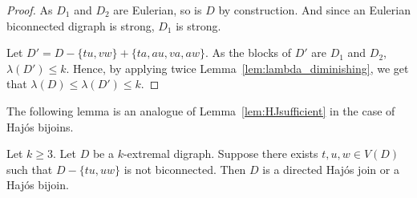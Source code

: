 \begin{proof}
    \smallskip

    As $D_1$ and $D_2$ are Eulerian,  so is $D$ by construction. And since an Eulerian biconnected digraph is strong, $D_1$ is strong. 

    \smallskip 
    
    Let $D' = D - \{tu,vw\} + \{ta,au,va,aw\}$. As the blocks of $D'$ are $D_1$ and $D_2$, $\lambda(D') \leq k$. Hence, by applying twice Lemma~\ref{lem:lambda_diminishing}, we get that $\lambda(D) \leq \lambda(D')  \leq k$.  
\end{proof}

The following lemma is an analogue of Lemma~\ref{lem:HJsufficient} in the case of Haj\'os bijoins.
\begin{lemma}\label{lem:HB_sufficient}
    Let $k \geq 3$. Let $D$ be a $k$-extremal digraph. Suppose there exists $t,u,w \in V(D)$ such that $D - \{tu,uw\}$ is not biconnected. Then $D$ is a directed Haj\'os join or a Haj\'os bijoin. 
\end{lemma} 

